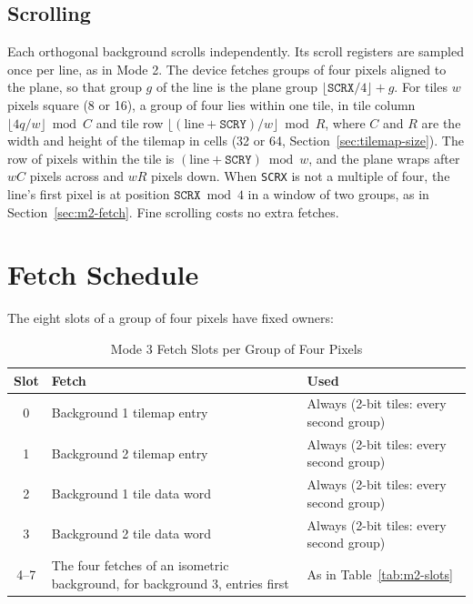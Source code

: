 \subsection{Scrolling}
\label{sec:m3-scrolling}

Each orthogonal background scrolls independently. Its scroll registers are sampled once per line, as in Mode 2. The
device fetches groups of four pixels aligned to the plane, so that group $g$ of the line is the plane group $\lfloor
	\texttt{SCRX}/4 \rfloor + g$. For tiles $w$ pixels square (8 or 16), a group of four lies within one tile, in tile
column $\lfloor 4q/w \rfloor \bmod C$ and tile row $\lfloor (\text{line} + \texttt{SCRY})/w \rfloor \bmod R$, where $C$
and $R$ are the width and height of the tilemap in cells (32 or 64, Section~\ref{sec:tilemap-size}). The row of pixels
within the tile is $(\text{line} + \texttt{SCRY}) \bmod w$, and the plane wraps after $wC$ pixels across and $wR$
pixels down. When \texttt{SCRX} is not a multiple of four, the line's first pixel is at position $\texttt{SCRX} \bmod
	4$ in a window of two groups, as in Section~\ref{sec:m2-fetch}. Fine scrolling costs no extra fetches.

\section{Fetch Schedule}

The eight slots of a group of four pixels have fixed owners:

\begin{table}[H]
	\centering
	\begin{tabular}{cp{5.8cm}p{5.2cm}}
		\toprule
		\textbf{Slot} & \textbf{Fetch}                                                               & \textbf{Used}                            \\
		\midrule
		0             & Background 1 tilemap entry                                                   & Always (2-bit tiles: every second group) \\
		1             & Background 2 tilemap entry                                                   & Always (2-bit tiles: every second group) \\
		2             & Background 1 tile data word                                                  & Always (2-bit tiles: every second group) \\
		3             & Background 2 tile data word                                                  & Always (2-bit tiles: every second group) \\
		4--7          & The four fetches of an isometric background, for background 3, entries first & As in Table~\ref{tab:m2-slots}           \\
		\bottomrule
	\end{tabular}
	\caption{Mode 3 Fetch Slots per Group of Four Pixels}
	\label{tab:m3-slots}
\end{table}

